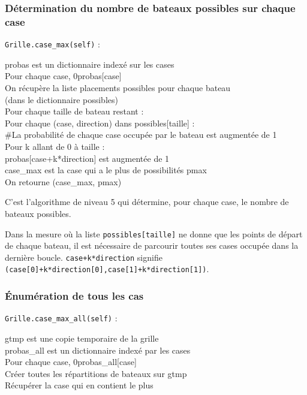 \subsubsection{Détermination du nombre de bateaux possibles sur chaque case}\label{case_max}
\texttt{Grille.case\_max(self)} :
\begin{algo1}
probas est un dictionnaire indexé sur les cases\\
Pour chaque case, 0\sto probas[case]\\
On récupère la liste placements possibles pour chaque bateau\\
 (dans le dictionnaire possibles)\\
Pour chaque taille de bateau restant :\\
Pour chaque (case, direction) dans possibles[taille] :\\
\#La probabilité de chaque case occupée par le bateau est augmentée de 1\\
Pour k allant de 0 à taille :\\
probas[case+k*direction] est augmentée de 1\\
case\_max est la case qui a le plus de possibilités pmax\\
On retourne (case\_max, pmax)\\
\end{algo1}

C'est l'algorithme de niveau 5 qui détermine, pour chaque case, le nombre de bateaux possibles.

Dans la mesure où la liste \texttt{possibles[taille]} ne donne que les points de départ de chaque bateau, il est nécessaire de parcourir toutes ses cases occupée dans la dernière boucle. \texttt{case+k*direction} signifie \texttt{(case[0]+k*direction[0],case[1]+k*direction[1])}.

\newpage
\subsubsection{Énumération de tous les cas}
\texttt{Grille.case\_max\_all(self)} :
\begin{algo1}
gtmp est une copie temporaire de la grille\\
probas\_all est un dictionnaire indexé par les cases\\
Pour chaque case, 0\sto probas\_all[case]\\
Créer toutes les répartitions de bateaux sur gtmp\\
Récupérer la case qui en contient le plus\\ 
\end{algo1}

